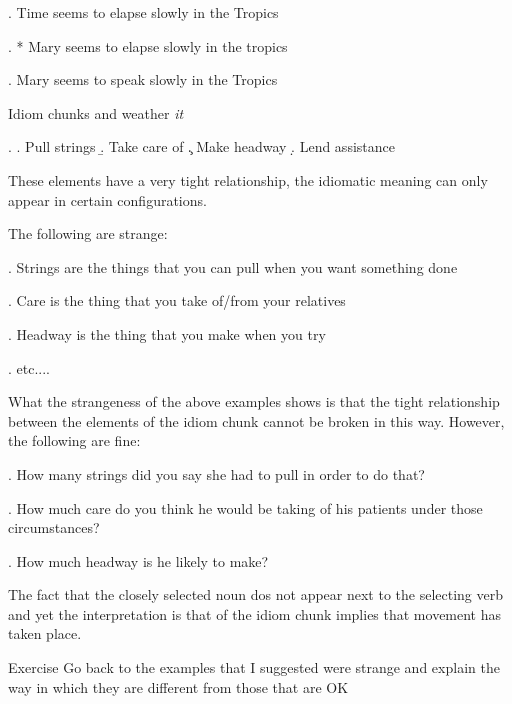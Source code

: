 \begin{frame}
  \ex.
Time seems to elapse slowly in the Tropics

\ex.
* Mary seems to elapse slowly in the tropics


\ex.
Mary seems to speak slowly in the Tropics

\end{frame}



\begin{frame}
  {Idiom chunks and weather \textit{it}}

\ex.
\a. Pull strings
\b. Take care of
\c. Make headway
\d. Lend assistance

These elements have a very tight relationship, the idiomatic meaning can only appear in certain configurations.


\end{frame}

\begin{frame}
  The following are strange:

\ex.
Strings are the things that you can pull when you want something done

\ex. 
Care is the thing that you take of/from your relatives


\ex.
Headway is the thing that you make when you try 


\ex.  etc....


\end{frame}

\begin{frame}
  What the strangeness of the above examples shows is that the tight relationship between the elements of the idiom chunk cannot be broken in this way.  However, the following are fine:
\end{frame}


\begin{frame}
  \ex.
How many strings did you say she had to pull in order to do that?

\ex.
How much care do you think he would be taking of his patients under those circumstances?

\ex.
How much headway is he likely to make?


\end{frame}

\begin{frame}
  The fact that the closely selected noun dos not appear next to the selecting verb and yet the interpretation is that of the idiom chunk implies that movement has taken place.


  \begin{block}
    {Exercise}
Go back to the examples that I suggested were strange and explain the way in which they are different from those that are OK
  \end{block}
\end{frame}


